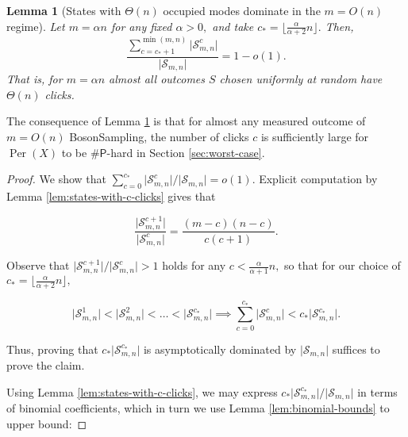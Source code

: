 \documentclass[11pt]{article}
\theoremstyle{plain}
\theoremstyle{plain}
\newtheorem{lem}{Lemma}
\theoremstyle{plain}
\theoremstyle{plain}
\theoremstyle{plain}
\theoremstyle{plain}
\theoremstyle{plain}
\theoremstyle{remark}
\theoremstyle{remark}
\theoremstyle{plain}
\theoremstyle{plain}
\theoremstyle{plain}
\theoremstyle{plain}
\newcommand{\Smn}{\mathcal{S}_{m,n}}
\newcommand{\Scmn}{\mathcal{S}^c_{m,n}}
\newcommand{\sharP}{\#\mathsf{P}}
\begin{document}
\begin{lem}[States with $\Theta(n)$ occupied modes dominate in the $m=O(n)$ regime] \label{lem:manyclicks}
    Let $m=\alpha n$ for any fixed $\alpha>0,$ and take $c_\ast = \lfloor \frac{\alpha}{\alpha+2}n \rfloor.$ Then, 
    \[\frac{\sum_{c = c_\ast + 1}^{\min(m,n)}\lvert\Scmn\rvert}{\vert\Smn\vert} = 1-o(1).\] That is, for $m=\alpha n$ almost all outcomes $S$ chosen uniformly at random have $\Theta(n)$ clicks.
\end{lem}

The consequence of Lemma \ref{lem:manyclicks} is that for almost any measured outcome of $m=O(n)$ BosonSampling,  the number of clicks $c$  is sufficiently large for $\operatorname*{Per}(X)$ to be $\sharP$-hard in Section \ref{sec:worst-case}.

\begin{proof}
    We show that $\sum_{c=0}^{c_\ast}\lvert\Scmn\rvert/\vert\Smn\vert = o(1).$ Explicit computation by Lemma \ref{lem:states-with-c-clicks} gives that

    \[\frac{\vert\mathcal{S}^{c+1}_{m,n}\vert}{\vert\mathcal{S}^{c}_{m,n}\vert} = \frac{(m-c)(n-c)}{c (c+1)}.\]

    
Observe that $\vert\mathcal{S}^{c+1}_{m,n}\vert/\vert\mathcal{S}^{c}_{m,n}\vert > 1 $ holds for any $c 
< \frac{\alpha}{\alpha+1}n,$ so that for our choice of $c_\ast = \lfloor \frac{\alpha}{\alpha+2}n \rfloor,$

\[\vert\Smn^1\vert < \vert\Smn^2\vert < \ldots < \vert\Smn^{c_\ast}\vert \implies \sum_{c=0}^{c_\ast} \vert\Smn^c\vert < c_\ast \vert \Smn^{c_\ast}\vert.\]

Thus, proving that $c_\ast \vert \Smn^{c_\ast}\vert$ is asymptotically dominated by $\vert \Smn \vert$ suffices to prove the claim. 

Using Lemma \ref{lem:states-with-c-clicks}, we may express $c_\ast \vert\Smn^{c_\ast}\vert/\vert\Smn\vert$ in terms of binomial coefficients, which in turn we use Lemma \ref{lem:binomial-bounds} to upper bound:


\end{proof}
\end{document}
